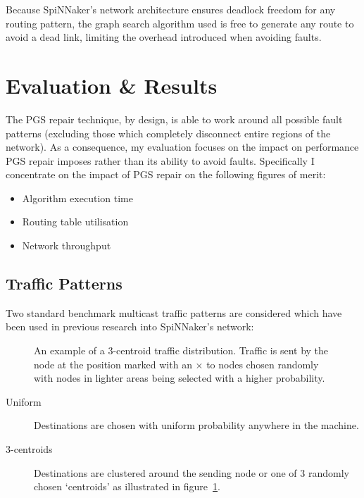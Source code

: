 		Because SpiNNaker's network architecture ensures deadlock freedom for any
		routing pattern, the graph search algorithm used is free to generate any
		route to avoid a dead link, limiting the overhead introduced when avoiding
		faults.
		
	\section{Evaluation \& Results}
		
		\label{sec:routing-evaluation}
		
		The PGS repair technique, by design, is able to work around all possible
		fault patterns (excluding those which completely disconnect entire regions
		of the network). As a consequence, my evaluation focuses on the impact on
		performance PGS repair imposes rather than its ability to avoid faults.
		Specifically I concentrate on the impact of PGS repair on the following
		figures of merit:
		
		\begin{itemize}
			\item Algorithm execution time
			\item Routing table utilisation
			\item Network throughput
		\end{itemize}
		
		\subsection{Traffic Patterns}
			
			Two standard benchmark multicast traffic patterns are considered which
			have been used in previous research into SpiNNaker's network:
			
			\begin{figure}
				\center
				
				\caption[An example of a 3-centroid traffic distribution.]%
				{An example of a 3-centroid traffic distribution. Traffic is
				sent by the node at the position marked with an {\color{red}$\times$}
				to nodes chosen randomly with nodes in lighter areas being selected
				with a higher probability.}
				\label{fig:traffic-distribution-centroids}
			\end{figure}
			
			\begin{description}
				
				\item[Uniform] Destinations are chosen with uniform probability
				anywhere in the machine.
				
				\item[3-centroids] Destinations are clustered around the sending node
				or one of 3 randomly chosen `centroids' as illustrated in
				figure~\ref{fig:traffic-distribution-centroids}.
				
			\end{description}
			
